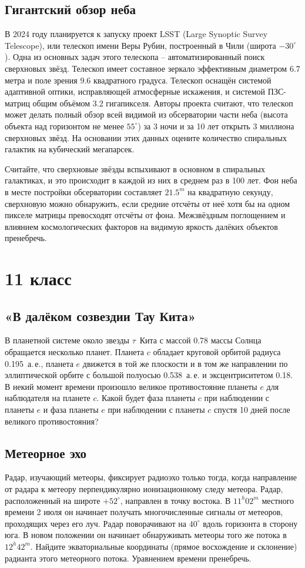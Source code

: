 \documentclass[12pt]{article}
\begin{document}
\subsection{Гигантский обзор неба}
В 2024 году планируется к запуску проект LSST (Large Synoptic Survey Telescope), или
телескоп имени Веры Рубин, построенный в Чили (широта $-30^\circ$). Одна из основных
задач этого телескопа -- автоматизированный поиск сверхновых звёзд. Телескоп имеет
составное зеркало эффективным диаметром 6.7 метра и поле зрения 9.6 квадратного
градуса. Телескоп оснащён системой адаптивной оптики, исправляющей атмосферные
искажения, и системой ПЗС-матриц общим объёмом 3.2 гигапикселя. Авторы проекта
считают, что телескоп может делать полный обзор всей видимой из обсерватории части
неба (высота объекта над горизонтом не менее $55^\circ$) за 3 ночи и за 10 лет
открыть 3 миллиона сверхновых звёзд. На основании этих данных оцените количество
спиральных галактик на кубический мегапарсек.

Считайте, что сверхновые звёзды вспыхивают в основном в спиральных галактиках, и это
происходит в каждой из них в среднем раз в 100 лет. Фон неба в месте постройки
обсерватории составляет $21.5^m$ на квадратную секунду, сверхновую можно обнаружить,
если средние отсчёты от неё хотя бы на одном пикселе матрицы превосходят отсчёты от
фона. Межзвёздным поглощением и влиянием космологических факторов на видимую яркость
далёких объектов пренебречь.

\clearpage
\section*{11 класс}

\subsection{«В далёком созвездии Тау Кита»}
В планетной системе около звезды $\tau$~Кита с массой 0.78 массы Солнца обращается
несколько планет. Планета $c$ обладает круговой орбитой радиуса 0.195~а.\,е.,
планета $e$ движется в той же плоскости и в том же направлении по эллиптической
орбите с большой полуосью 0.538~а.\,е. и эксцентриситетом 0.18. В некий момент
времени произошло великое противостояние планеты $e$ для наблюдателя на планете $c$.
Какой будет фаза планеты $c$ при наблюдении с планеты $e$ и фаза планеты $e$ при
наблюдении с планеты $c$ спустя 10 дней после великого противостояния?

\subsection{Метеорное эхо}
Радар, изучающий метеоры, фиксирует радиоэхо только тогда, когда направление от
радара к метеору перпендикулярно ионизационному следу метеора. Радар, расположенный
на широте $+52^\circ$, направлен в точку востока. В $11^h02^m$ местного времени
2 июля он начинает получать многочисленные сигналы от метеоров, проходящих через его
луч. Радар поворачивают на $40^\circ$ вдоль горизонта в сторону юга. В новом
положении он начинает обнаруживать метеоры того же потока в $12^h42^m$. Найдите
экваториальные координаты (прямое восхождение и склонение) радианта этого метеорного
потока. Уравнением времени пренебречь.
\end{document}
